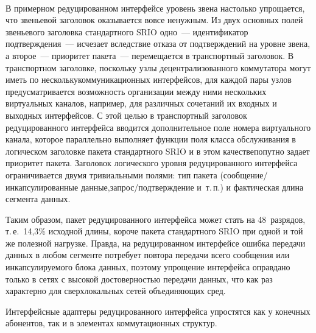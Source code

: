 \begin{multicols}{2}
\begin{figure*} %
\vspace*{1pt}
\begin{center}
\vspace*{1pt}
\mbox{%
\epsfxsize=102.381mm
}
\end{center}
\vspace*{-9pt}
\vspace*{3pt}
\end{figure*}

     В примерном редуцированном интерфейсе уровень звена настолько упрощается, что 
звеньевой заголовок оказывается вовсе ненужным. Из двух основных полей звеньевого 
заголовка стандартного SRIO одно~--- идентификатор подтверждения~--- исчезает 
вследствие отказа от подтверждений на\linebreak
уровне звена, а второе~--- приоритет пакета~--- 
пе\-ремещается в транспортный заголовок. В транспортном заголовке, поскольку узлы 
децентрализованного коммутатора могут иметь по нескольку\linebreak коммуникационных 
интерфейсов, для каждой пары узлов предусматривается возможность организации между 
ними нескольких виртуальных каналов, например, для различных сочетаний их входных и 
выходных интерфейсов. С этой целью в транспортный заголовок редуцированного 
интерфейса вводится дополнительное поле номера виртуального канала, которое 
параллельно выполняет функции поля класса обслуживания в логическом заголовке пакета 
стандартного SRIO и в этом качестве\linebreak попутно задает приоритет пакета. Заголовок 
логического уровня редуцированного интерфейса ограничивается двумя тривиальными 
полями: тип пакета (сообщение/инкапсулированные данные,\linebreak запрос/подтверждение и~т.\,п.) 
и фактическая длина сегмента данных.
     
     Таким образом, пакет редуцированного интерфейса может стать на 48~разрядов, т.\,е.\ 
14,3\% исходной длины, короче пакета стандартного SRIO при одной и той же полезной  
нагрузке. Правда, на редуцированном интерфейсе ошибка передачи данных в любом 
сегменте потребует повтора передачи всего сообщения или инкапсулируемого блока 
данных, поэтому упрощение интерфейса оправдано только в сетях с высокой 
достоверностью передачи данных, что как раз характерно для сверхлокальных сетей 
объединяющих сред.
     
     Интерфейсные адаптеры редуцированного интерфейса упростятся как у конечных 
абонентов, так и в элементах коммутационных структур.
     

\end{multicols}
